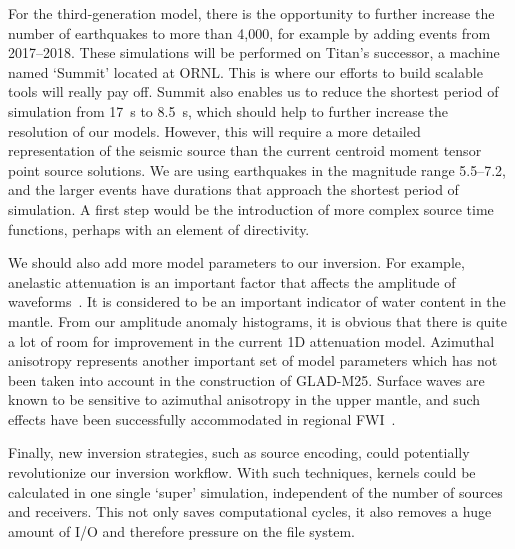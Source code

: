 For the third-generation model,
there is the opportunity to further increase the number of earthquakes to more than 4,000,
for example by adding events from 2017--2018.
These simulations will be performed on Titan's successor, a machine named `Summit' located at ORNL.
This is where our efforts to build scalable tools will really pay off.
Summit also enables us to reduce the shortest period of simulation from 17~s to 8.5~s,
which should help to further increase the resolution of our models.
However, this will require a more detailed representation of the seismic source than the current
centroid moment tensor point source solutions.
We are using earthquakes in the magnitude range 5.5--7.2, and the larger events have durations that approach the shortest period of simulation.
A first step would be the introduction of more complex source time functions,
perhaps with an element of directivity.

We should also add more model parameters to our inversion.
For example,
anelastic attenuation is an important factor that affects
the amplitude of waveforms~\cite{Zhuetal2013}.
It is considered to be an important
indicator of water content in the mantle.
From our amplitude anomaly histograms, it is obvious that 
there is quite a lot of room for improvement in the current 1D attenuation model.
Azimuthal anisotropy represents another important set of model parameters which has not been taken
into account in the construction of GLAD-M25.
Surface waves are known to be sensitive to azimuthal anisotropy in the upper mantle,
and such effects have been successfully accommodated in regional FWI~\cite{ZhuTromp2013}.

Finally,
new inversion strategies, such as source encoding,
could potentially revolutionize our inversion workflow.
With such techniques, kernels could be calculated in one single `super' simulation,
independent of the number of sources and receivers.
This not only saves computational cycles,
it also removes a huge amount of I/O and therefore pressure on the file system.
